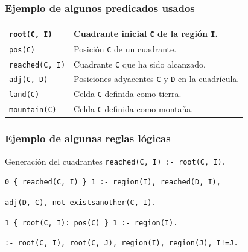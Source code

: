 \begin{frame}
\frametitle{Ejemplo de algunos predicados usados}

\begin{table}
	\def\arraystretch{1.5}
	\centering
	\begin{tabular}{l p{}}
		\hline
		\texttt{root(C, I)} & Cuadrante inicial \texttt{C} de la región \texttt{I}. \\
		\hline
		\texttt{pos(C)} & Posición \texttt{C} de un cuadrante. \\
		\hline
		\texttt{reached(C, I)} & Cuadrante \texttt{C} que ha sido alcanzado. \\
		\hline
		\texttt{adj(C, D)} & Posiciones adyacentes \texttt{C} y \texttt{D} en la cuadrícula. \\
		\hline
		\texttt{land(C)} & Celda \texttt{C} definida como tierra. \\
		\hline
		\texttt{mountain(C)} & Celda \texttt{C} definida como montaña. \\
		\hline
	\end{tabular}
\end{table}

\end{frame}

\begin{frame}
	\frametitle{Ejemplo de algunas reglas lógicas}
	
	\begin{block}{Generación del cuadrantes}		
	\vspace{1em}
	\hspace{2em}\texttt{reached(C, I) :- root(C, I).}
	
	\vspace{1em}
	
	\pause
	
	\hspace{2em}\texttt{0 \{ reached(C, I) \} 1 :- region(I), reached(D, I),}
	
	\hspace{4em}\texttt{adj(D, C), not existsanother(C, I).}
	
	\vspace{1em}
	
	\pause
	
	\hspace{2em}\texttt{1 \{ root(C, I): pos(C) \} 1 :- region(I).}
	
	\vspace{1em}
	
	\pause
	
	\hspace{2em}\texttt{:- root(C, I), root(C, J), region(I), region(J), I!=J.}
	\vspace{1em}
	\end{block}
	
\end{frame}

